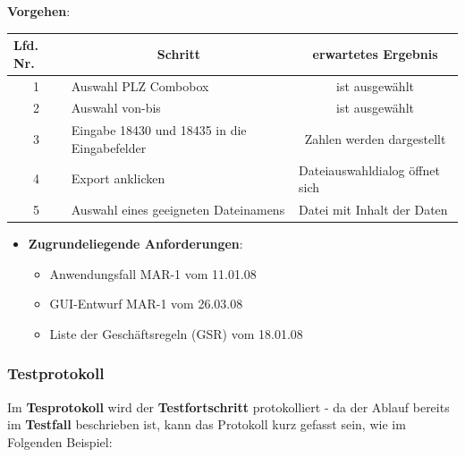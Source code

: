     \noindent
    \textbf{Vorgehen}:
    \begin{table}[]
        \centering
        \setlength{\tabcolsep}{0.5em}
        \def\arraystretch{1.5}
        \begin{tabular}{|c|l|c|}
            \hline
            \multicolumn{1}{|l|}{\textbf{Lfd. Nr.}} & \multicolumn{1}{c|}{\textbf{Schritt}}        & \textbf{erwartetes Ergebnis}                        \\ \hline
            1                                       & Auswahl PLZ Combobox                         & ist ausgewählt                                      \\ \hline
            2                                       & Auswahl von-bis                              & ist ausgewählt                                      \\ \hline
            3                                       & Eingabe 18430 und 18435 in die Eingabefelder & Zahlen werden dargestellt                           \\ \hline
            4                              & Export anklicken                             & \multicolumn{1}{l|}{Dateiauswahldialog öffnet sich} \\ \hline
            5                              & Auswahl eines geeigneten Dateinamens         & \multicolumn{1}{l|}{Datei mit Inhalt der Daten}     \\ \hline
        \end{tabular}
    \end{table}

\begin{itemize}
    \item[] \textbf{Zugrundeliegende Anforderungen}:
    \begin{itemize}
        \item Anwendungsfall MAR-1 vom 11.01.08
        \item GUI-Entwurf MAR-1 vom 26.03.08
        \item Liste der Geschäftsregeln (GSR) vom 18.01.08
    \end{itemize}
\end{itemize}

\subsubsection*{Testprotokoll}
Im \textbf{Tesprotokoll} wird der \textbf{Testfortschritt} protokolliert - da der Ablauf bereits im \textbf{Testfall} beschrieben ist, kann das Protokoll kurz gefasst sein, wie im Folgenden Beispiel:

